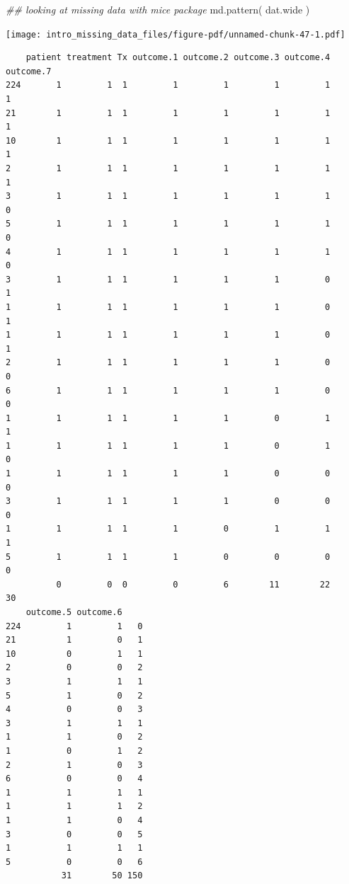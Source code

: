 \documentclass[
  letterpaper,
  DIV=11,
  numbers=noendperiod]{scrreprt}
\newenvironment{Shaded}{}{}
\newcommand{\DocumentationTok}[1]{\textcolor[rgb]{0.73,0.13,0.13}{\textit{#1}}}
\newcommand{\FunctionTok}[1]{\textcolor[rgb]{0.02,0.16,0.49}{#1}}
\newcommand{\NormalTok}[1]{#1}
\begin{document}
\begin{Shaded}
\begin{Highlighting}[]
\DocumentationTok{\#\# looking at missing data with mice package}
  \FunctionTok{md.pattern}\NormalTok{( dat.wide )}
\end{Highlighting}
\end{Shaded}

\begin{center}
\texttt{[image: intro\_missing\_data\_files/figure-pdf/unnamed-chunk-47-1.pdf]}
\end{center}

\begin{verbatim}
    patient treatment Tx outcome.1 outcome.2 outcome.3 outcome.4 outcome.7
224       1         1  1         1         1         1         1         1
21        1         1  1         1         1         1         1         1
10        1         1  1         1         1         1         1         1
2         1         1  1         1         1         1         1         1
3         1         1  1         1         1         1         1         0
5         1         1  1         1         1         1         1         0
4         1         1  1         1         1         1         1         0
3         1         1  1         1         1         1         0         1
1         1         1  1         1         1         1         0         1
1         1         1  1         1         1         1         0         1
2         1         1  1         1         1         1         0         0
6         1         1  1         1         1         1         0         0
1         1         1  1         1         1         0         1         1
1         1         1  1         1         1         0         1         0
1         1         1  1         1         1         0         0         0
3         1         1  1         1         1         0         0         0
1         1         1  1         1         0         1         1         1
5         1         1  1         1         0         0         0         0
          0         0  0         0         6        11        22        30
    outcome.5 outcome.6    
224         1         1   0
21          1         0   1
10          0         1   1
2           0         0   2
3           1         1   1
5           1         0   2
4           0         0   3
3           1         1   1
1           1         0   2
1           0         1   2
2           1         0   3
6           0         0   4
1           1         1   1
1           1         1   2
1           1         0   4
3           0         0   5
1           1         1   1
5           0         0   6
           31        50 150
\end{verbatim}
\end{document}
